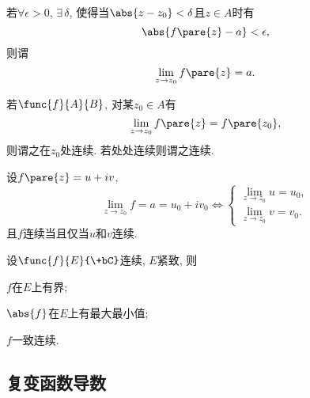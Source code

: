 \documentclass[../ComplexVariable.tex]{subfiles}
\begin{document}
\begin{definition}[复变函数极限]
    若$\forall \epsilon>0$, $\exists\, \delta$, 使得当$\abs{z-z_0} < \delta$且$z\in A$时有
    \[ \abs{f\pare{z} - a} < \epsilon, \]
    则谓
    \[ \lim_{z\rightarrow z_0} f\pare{z} = a. \]
\end{definition}
\begin{definition}[复变函数连续]
    若$\func{f}{A}{B}$, 对某$z_0 \in A$有
    \[ \lim_{z\rightarrow z_0} f\pare{z} = f\pare{z_0}, \]
    则谓之在$z_0$处连续. 若处处连续则谓之连续.
\end{definition}
\begin{theorem}[函数极限作为实部和虚部的极限]
    设$f\pare{z} = u+iv$,
    \[ \lim_{z\rightarrow z_0} f = a = u_0 + iv_0\Leftrightarrow \begin{cases}
        \displaystyle \lim_{z \rightarrow z_0} u = u_0,\\
        \displaystyle \lim_{z \rightarrow z_0} v = v_0.
    \end{cases} \]
    且$f$连续当且仅当$u$和$v$连续.
\end{theorem}
\begin{theorem}
    设$\func{f}{E}{\+bC}$连续, $E$紧致, 则
    \begin{cenum}
        \item $f$在$E$上有界;
        \item $\abs{f}$在$E$上有最大最小值;
        \item $f$一致连续.
    \end{cenum}
\end{theorem}


\subsection{复变函数导数} %
\label{sub:复变函数导数}
\end{document}
